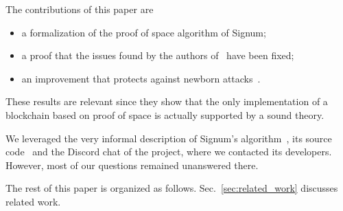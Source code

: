 The contributions of this paper are
%
\begin{itemize}
\item a formalization of the proof of space algorithm of Signum;
\item a proof that the issues found by the authors of~\cite{ParkKFGAP18} have been fixed;
\item an improvement that protects against newborn attacks~\cite{TangZDWLG0L19}.
\end{itemize}
%
These results are relevant since they show that the only implementation
of a blockchain based on proof of space is actually supported by a sound theory.

We leveraged the very informal description of Signum's algorithm~\cite{SignumPlotting},
its source code~\cite{SignumSource} and the Discord chat of the project, where we contacted
its developers. However, most of our questions remained unanswered there.

The rest of this paper is organized as follows.
Sec.~\ref{sec:related_work} discusses related work.
